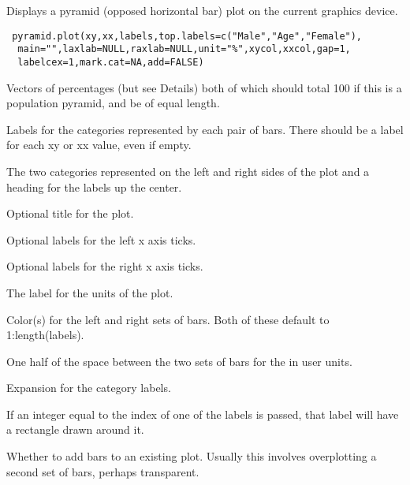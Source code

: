 \begin{Description}\relax
Displays a pyramid (opposed horizontal bar) plot on the current
graphics device.
\end{Description}
\begin{Usage}
\begin{verbatim}
 pyramid.plot(xy,xx,labels,top.labels=c("Male","Age","Female"),
  main="",laxlab=NULL,raxlab=NULL,unit="%",xycol,xxcol,gap=1,
  labelcex=1,mark.cat=NA,add=FALSE)
\end{verbatim}
\end{Usage}
\begin{Arguments}
\begin{ldescription}
\item[\code{xy,xx}] Vectors of percentages (but see Details) both of which
should total 100 if this is a population pyramid, and be of equal length.
\item[\code{labels}] Labels for the categories represented by each pair of
bars. There should be a label for each xy or xx value, even if empty.
\item[\code{top.labels}] The two categories represented on the left and right
sides of the plot and a heading for the labels up the center.
\item[\code{main}] Optional title for the plot.
\item[\code{laxlab}] Optional labels for the left x axis ticks.
\item[\code{raxlab}] Optional labels for the right x axis ticks.
\item[\code{unit}] The label for the units of the plot.
\item[\code{xycol,xxcol}] Color(s) for the left and right sets of bars. Both of
these default to 1:length(labels).
\item[\code{gap}] One half of the space between the two sets of bars for the
 in user units.
\item[\code{labelcex}] Expansion for the category labels.
\item[\code{mark.cat}] If an integer equal to the index of one of the labels
is passed, that label will have a rectangle drawn around it.
\item[\code{add}] Whether to add bars to an existing plot. Usually this
involves overplotting a second set of bars, perhaps transparent.
\end{ldescription}
\end{Arguments}
